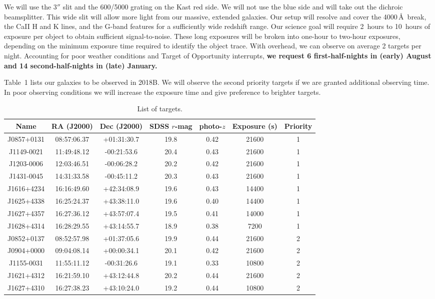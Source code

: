 \documentclass[letterpaper,12pt]{article}
\begin{document}
We will use the $3''$ slit and the 600/5000 grating on the Kast red side. We will not use the blue side and will take 
out the dichroic beamsplitter. This wide slit will allow more light from our massive, extended galaxies. Our setup will 
resolve and cover the 4000\,\AA\ break, the CaII H and K lines, and the G-band features for a sufficiently wide 
redshift range. 
Our science goal will require 2~hours to 10~hours of exposure per object to obtain sufficient signal-to-noise. These 
long exposures will be broken into one-hour to two-hour exposures, depending on the minimum exposure time required to 
identify the object trace. With overhead, we can observe on average 2 targets per night. Accounting for poor weather 
conditions and Target of Opportunity interrupts, {\bf we request 6 first-half-nights in (early) August and 14 
second-half-nights in (late) January.}

Table~1 lists our galaxies to be observed in 2018B. We will observe the second priority targets if we are granted 
additional observing time. In poor observing conditions we will increase the exposure time and give preference to 
brighter targets. 

\begin{table}
\caption{List of targets.}
\begin{tabular}{ccccccc}
\hline
Name & RA (J2000) & Dec (J2000) & SDSS $r$-mag & photo-$z$ & Exposure (s) & Priority \\
\hline
J0857+0131 & 08:57:06.37 & +01:31:30.7 & 19.8 & 0.42 & 21600 & 1 \\
J1149-0021 & 11:49:48.12 & -00:21:53.6 & 20.4 & 0.43 & 21600 & 1 \\
J1203-0006 & 12:03:46.51 & -00:06:28.2 & 20.2 & 0.42 & 21600 & 1 \\
J1431-0045 & 14:31:33.58 & -00:45:11.2 & 20.3 & 0.43 & 21600 & 1 \\
J1616+4234 & 16:16:49.60 & +42:34:08.9 & 19.6 & 0.43 & 14400 & 1 \\
J1625+4338 & 16:25:24.37 & +43:38:11.0 & 19.6 & 0.40 & 14400 & 1 \\
J1627+4357 & 16:27:36.12 & +43:57:07.4 & 19.5 & 0.41 & 14000 & 1 \\
J1628+4314 & 16:28:29.55 & +43:14:55.7 & 18.9 & 0.38 & 7200 & 1 \\
J0852+0137 & 08:52:57.98 & +01:37:05.6 & 19.9 & 0.44 & 21600 & 2 \\
J0904+0000 & 09:04:08.14 & +00:00:34.1 & 20.1 & 0.42 & 21600 & 2 \\
J1155-0031 & 11:55:11.12 & -00:31:26.6 & 19.1 & 0.33 & 10800 & 2 \\
J1621+4312 & 16:21:59.10 & +43:12:44.8 & 20.2 & 0.44 & 21600 & 2 \\
J1627+4310 & 16:27:38.23 & +43:10:24.0 & 19.2 & 0.44 & 10800 & 2 \\
\hline
\end{tabular}
\end{table}
\end{document}
